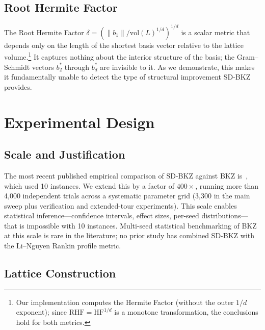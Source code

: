 \documentclass[journal=cic,version=preprint]{iacrj}
\begin{document}
\subsection{Root Hermite Factor}

The Root Hermite Factor $\delta = (\|b_1\| / \mathrm{vol}(L)^{1/d})^{1/d}$ is a scalar metric that depends only on the length of the shortest basis vector relative to the lattice volume.\footnote{Our implementation computes the Hermite Factor (without the outer $1/d$ exponent); since $\mathrm{RHF} = \mathrm{HF}^{1/d}$ is a monotone transformation, the conclusions hold for both metrics.} It captures nothing about the interior structure of the basis; the Gram--Schmidt vectors $b^*_2$ through $b^*_d$ are invisible to it. As we demonstrate, this makes it fundamentally unable to detect the type of structural improvement SD-BKZ provides.

\section{Experimental Design}
\label{sec:design}

\subsection{Scale and Justification}

The most recent published empirical comparison of SD-BKZ against BKZ is~\cite{EC:MicWal16}, which used 10 instances. We extend this by a factor of $400\times$, running more than 4{,}000 independent trials across a systematic parameter grid (3{,}300 in the main sweep plus verification and extended-tour experiments). This scale enables statistical inference---confidence intervals, effect sizes, per-seed distributions---that is impossible with 10 instances. Multi-seed statistical benchmarking of BKZ at this scale is rare in the literature; no prior study has combined SD-BKZ with the Li--Nguyen Rankin profile metric.

\subsection{Lattice Construction}
\end{document}
